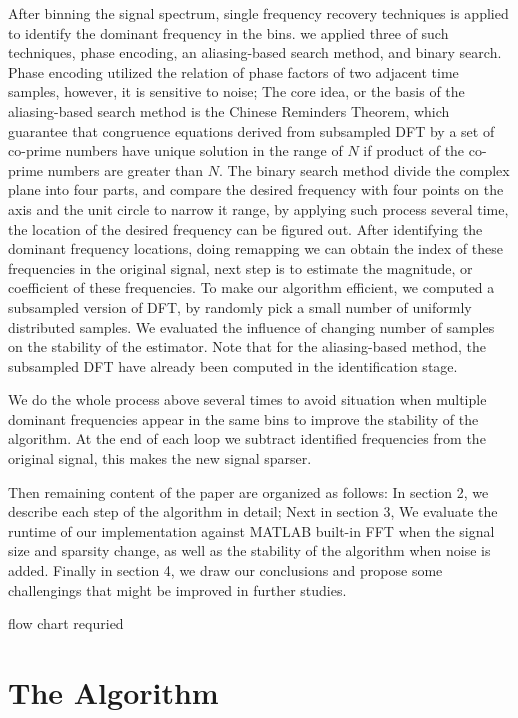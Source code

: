 \documentclass[journal,transmag]{IEEEtran}
\begin{document}
After binning the signal spectrum, single frequency recovery techniques is applied to identify the dominant frequency in the bins. we applied three of such techniques, phase encoding, an aliasing-based search method, and binary search. Phase encoding utilized the relation of phase factors of two adjacent time samples, however, it is sensitive to noise; The core idea, or the basis of the aliasing-based search method is the Chinese Reminders Theorem, which guarantee that congruence equations derived from subsampled DFT by a set of co-prime numbers have unique solution in the range of $N$ if product of the co-prime numbers are greater than $N$. The binary search method divide the complex plane into four parts, and compare the desired frequency with four points on the axis and the unit circle to narrow it range, by applying such process several time, the location of the desired frequency can be figured out. After identifying the dominant frequency locations, doing remapping we can obtain the index of these frequencies in the original signal, next step is to estimate the magnitude, or coefficient of these frequencies. To make our algorithm efficient, we computed a subsampled version of DFT, by randomly pick a small number of uniformly distributed samples. We evaluated the influence of changing number of samples on the stability of the estimator. Note that for the aliasing-based method, the subsampled DFT have already been computed in the identification stage.

We do the whole process above several times to avoid situation when multiple dominant frequencies appear in the same bins to improve the stability of the algorithm. At the end of each loop we subtract identified frequencies from the original signal, this makes the new signal sparser.

Then remaining content of the paper are organized as follows: In section 2, we describe each step of the algorithm in detail; Next in section 3, We evaluate the runtime of our implementation against MATLAB built-in FFT when the signal size and sparsity change, as well as the stability of the algorithm when noise is added. Finally in section 4, we draw our conclusions and propose some challengings that might be improved in further studies.

flow chart requried

\section{The Algorithm}
\end{document}
